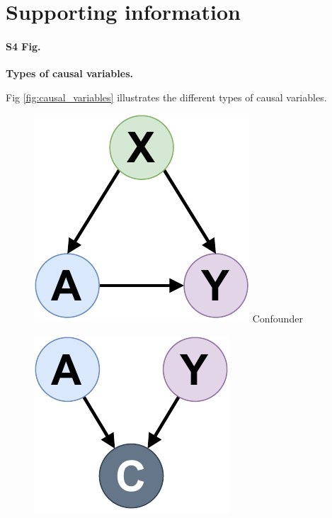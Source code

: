 \documentclass[10pt,letterpaper]{article}
\begin{document}
\vspace*{0.2in}

\section*{Supporting information}

\paragraph*{S4 Fig.}
\label{apd:causal_variables}
{\bf Types of causal variables.}

Fig \ref{fig:causal_variables} illustrates the different types of causal variables.

\begin{figure}[h!]
    \begin{minipage}[t]{0.32\linewidth}
        \centering
        \includegraphics[width=0.72\linewidth]{img_supp_final/confounder.pdf}
        \small\sffamily Confounder
    \end{minipage}
    \hfill
    \begin{minipage}[t]{0.32\linewidth}
        \centering
        \includegraphics[width=0.72\linewidth]{img_supp_final/collider.pdf}

\end{minipage}
\end{figure}
\end{document}
